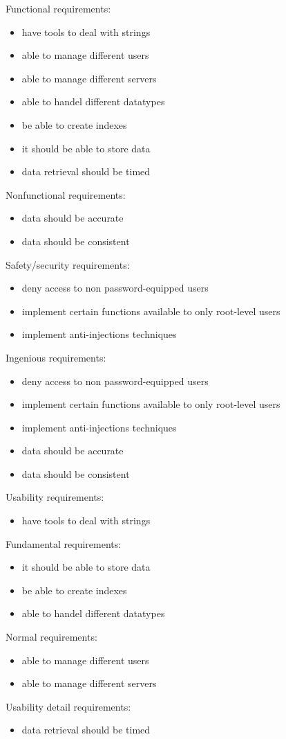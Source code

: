 \begin{elenco}
\item Functional requirements:
\begin{itemize}
    \item have tools to deal with strings
    \item able to manage different users
    \item able to manage different servers
    \item able to handel different datatypes
    \item be able to create indexes
    \item it should be able to store data
    \item data retrieval should be timed
\end{itemize}
\item Nonfunctional requirements:
\begin{itemize}
    \item data should be accurate
    \item data should be consistent
\end{itemize}
\item Safety/security requirements:
\begin{itemize}
	\item deny access to non password-equipped users
	\item implement certain functions available to only root-level users
	\item implement anti-injections techniques
\end{itemize}

Ingenious requirements:
\begin{itemize}
	\item deny access to non password-equipped users
	\item implement certain functions available to only root-level users
	\item implement anti-injections techniques
    \item data should be accurate
    \item data should be consistent
\end{itemize}
 Usability requirements: 
\begin{itemize}
    \item have tools to deal with strings
\end{itemize}
Fundamental requirements:
\begin{itemize}
    \item it should be able to store data
    \item be able to create indexes
    \item able to handel different datatypes
\end{itemize}
Normal requirements:
\begin{itemize}
    \item able to manage different users
    \item able to manage different servers
\end{itemize}
    \item Usability detail requirements:
\begin{itemize}
    \item data retrieval should be timed
\end{itemize}
\end{elenco}
